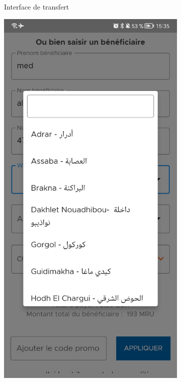 \begin{itemize}[label=$\ast$]
\begin{figure}
\begin{subfigure}[b]{0.3\textwidth}
		\caption{Interface de transfert}
		\label{fig:three sin x}
	\end{subfigure}
	\hfill
	\begin{subfigure}[b]{0.3\textwidth}
		\centering
		\includegraphics[width=\textwidth]{./Template LaTeX/Images/12.jpg}

\end{subfigure}
\end{figure}
\end{itemize}
